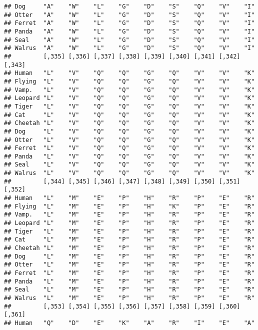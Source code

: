 \documentclass[]{article}
\begin{document}
\begin{verbatim}
## Dog     "A"    "W"    "L"    "G"    "D"    "S"    "Q"    "V"    "I"   
## Otter   "A"    "W"    "L"    "G"    "D"    "S"    "Q"    "V"    "I"   
## Ferret  "A"    "W"    "L"    "G"    "D"    "S"    "Q"    "V"    "I"   
## Panda   "A"    "W"    "L"    "G"    "D"    "S"    "Q"    "V"    "I"   
## Seal    "A"    "W"    "L"    "G"    "D"    "S"    "Q"    "V"    "I"   
## Walrus  "A"    "W"    "L"    "G"    "D"    "S"    "Q"    "V"    "I"   
##         [,335] [,336] [,337] [,338] [,339] [,340] [,341] [,342] [,343]
## Human   "L"    "V"    "Q"    "Q"    "G"    "Q"    "V"    "V"    "K"   
## Flying  "L"    "V"    "Q"    "Q"    "G"    "Q"    "V"    "V"    "K"   
## Vamp.   "L"    "V"    "Q"    "Q"    "G"    "Q"    "V"    "V"    "K"   
## Leopard "L"    "V"    "Q"    "Q"    "G"    "Q"    "V"    "V"    "K"   
## Tiger   "L"    "V"    "Q"    "Q"    "G"    "Q"    "V"    "V"    "K"   
## Cat     "L"    "V"    "Q"    "Q"    "G"    "Q"    "V"    "V"    "K"   
## Cheetah "L"    "V"    "Q"    "Q"    "G"    "Q"    "V"    "V"    "K"   
## Dog     "L"    "V"    "Q"    "Q"    "G"    "Q"    "V"    "V"    "K"   
## Otter   "L"    "V"    "Q"    "Q"    "G"    "Q"    "V"    "V"    "K"   
## Ferret  "L"    "V"    "Q"    "Q"    "G"    "Q"    "V"    "V"    "K"   
## Panda   "L"    "V"    "Q"    "Q"    "G"    "Q"    "V"    "V"    "K"   
## Seal    "L"    "V"    "Q"    "Q"    "G"    "Q"    "V"    "V"    "K"   
## Walrus  "L"    "V"    "Q"    "Q"    "G"    "Q"    "V"    "V"    "K"   
##         [,344] [,345] [,346] [,347] [,348] [,349] [,350] [,351] [,352]
## Human   "L"    "M"    "E"    "P"    "H"    "R"    "P"    "E"    "R"   
## Flying  "L"    "M"    "E"    "P"    "H"    "K"    "P"    "E"    "R"   
## Vamp.   "L"    "M"    "E"    "P"    "H"    "R"    "P"    "E"    "R"   
## Leopard "L"    "M"    "E"    "P"    "H"    "R"    "P"    "E"    "R"   
## Tiger   "L"    "M"    "E"    "P"    "H"    "R"    "P"    "E"    "R"   
## Cat     "L"    "M"    "E"    "P"    "H"    "R"    "P"    "E"    "R"   
## Cheetah "L"    "M"    "E"    "P"    "H"    "R"    "P"    "E"    "R"   
## Dog     "L"    "M"    "E"    "P"    "H"    "R"    "P"    "E"    "R"   
## Otter   "L"    "M"    "E"    "P"    "H"    "R"    "P"    "E"    "R"   
## Ferret  "L"    "M"    "E"    "P"    "H"    "R"    "P"    "E"    "R"   
## Panda   "L"    "M"    "E"    "P"    "H"    "R"    "P"    "E"    "R"   
## Seal    "L"    "M"    "E"    "P"    "H"    "R"    "P"    "E"    "R"   
## Walrus  "L"    "M"    "E"    "P"    "H"    "R"    "P"    "E"    "R"   
##         [,353] [,354] [,355] [,356] [,357] [,358] [,359] [,360] [,361]
## Human   "Q"    "D"    "E"    "K"    "A"    "R"    "I"    "E"    "A"   

\end{verbatim}
\end{document}
